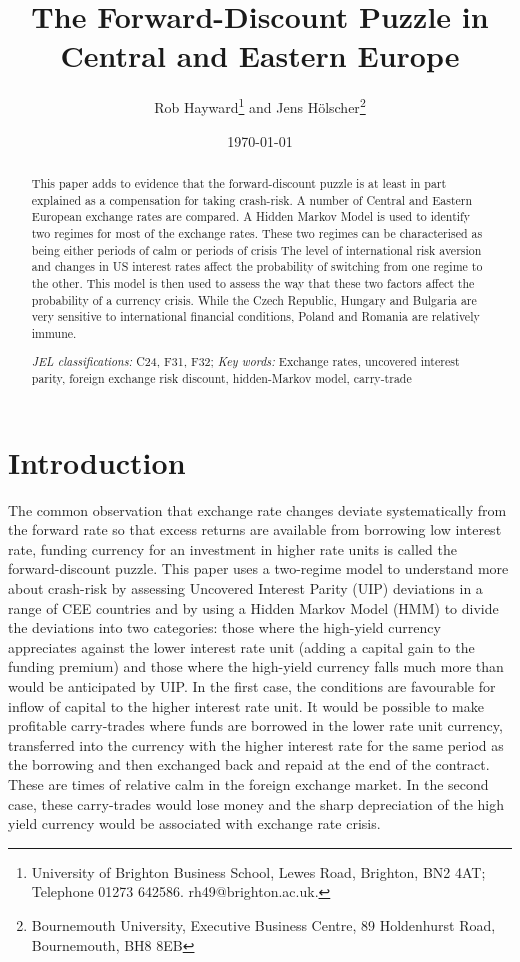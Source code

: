 \documentclass[12pt, a4paper, oneside]{article}\usepackage[]{graphicx}\usepackage[]{color}
\begin{document}
\title{The Forward-Discount Puzzle in Central and Eastern Europe}
\author{Rob Hayward\footnote{University of Brighton Business School, Lewes Road, Brighton, BN2 4AT; Telephone 01273 642586.  rh49@brighton.ac.uk.} and Jens H\"{o}lscher\footnote{Bournemouth University, Executive Business Centre, 89 Holdenhurst Road, Bournemouth, BH8 8EB}}  
\date{\today}
\maketitle
\begin{abstract}
This paper adds to evidence that the forward-discount puzzle is at least in part explained as a compensation for taking crash-risk. A number of Central and Eastern European exchange rates are compared. A Hidden Markov Model is used to identify two regimes for most of the exchange rates.  These two regimes can be characterised as being either periods of calm or periods of crisis The level of international risk aversion and changes in US interest rates affect the probability of switching from one regime to the other. This model is then used to assess the way that these two factors affect the probability of a currency crisis. While the Czech Republic,  Hungary and Bulgaria are very sensitive to international financial conditions, Poland and Romania are relatively immune.  

\emph{JEL classifications:} C24, F31, F32; 
\emph{Key words:} Exchange rates, uncovered interest parity, foreign exchange risk discount, hidden-Markov model, carry-trade


\end{abstract}

\section{Introduction}
The common observation that exchange rate changes deviate systematically from the forward rate so that excess returns are available from borrowing low interest rate, funding currency for an investment in higher rate units is called the forward-discount puzzle.   This paper uses a two-regime model to understand more about crash-risk by assessing Uncovered Interest Parity (UIP) deviations in a range of CEE countries and by using a Hidden Markov Model (HMM) to divide the deviations into two categories: those where the high-yield currency appreciates against the lower interest rate unit (adding a capital gain to the funding premium)  and those where the high-yield currency falls much more than would be anticipated by UIP.  In the first case, the conditions are favourable for inflow of capital to the higher interest rate unit.  It would be possible to make profitable carry-trades where funds are borrowed in the lower rate unit currency, transferred into the currency with the higher interest rate for the same period as the borrowing and then exchanged back and repaid at the end of the contract. These are times of relative calm in the foreign exchange market. In the second case, these carry-trades would lose money and the sharp depreciation of the high yield currency would be associated with exchange rate crisis. 
\end{document}
